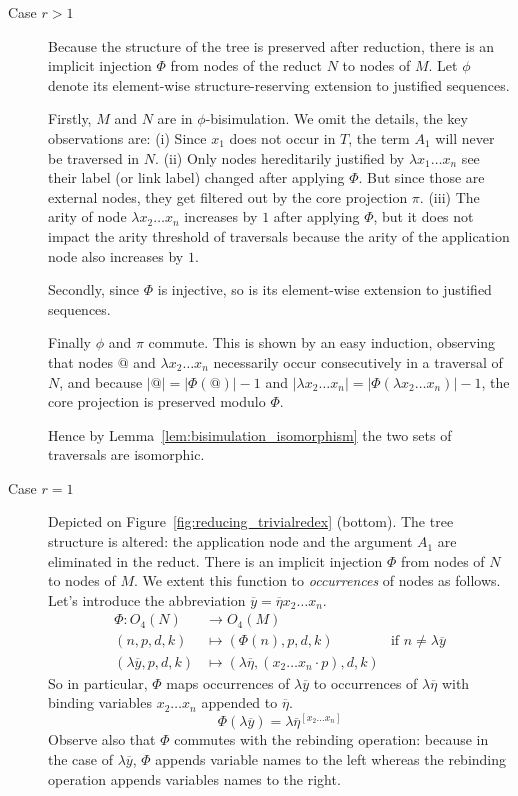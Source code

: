 \documentclass{article}
\theoremstyle{plain}
\theoremstyle{definition}
\theoremstyle{remark}
\def\coresymbol{\pi} %
\begin{document}
    \begin{description}
    \item[Case $r>1$] Because the structure of the tree is preserved after reduction, there is an implicit injection $\Phi$ from nodes of the reduct $N$ to nodes of $M$. Let $\phi$ denote its element-wise structure-reserving  extension to justified sequences.

    Firstly, $M$ and $N$ are in $\phi$-bisimulation. We omit the details, the key observations are:
    (i) Since $x_1$ does not occur in $T$, the term $A_1$ will never be traversed in $N$.
    (ii) Only nodes hereditarily justified by $\lambda x_1 \ldots x_n$ see their label (or link label) changed after applying $\Phi$. But since those are external nodes, they get filtered out by the core projection $\coresymbol$.
    (iii) The arity of node $\lambda x_2 \ldots x_n$ increases by $1$ after applying $\Phi$, but it does not impact the arity threshold of traversals because the arity of the application node also increases by $1$.

    Secondly, since $\Phi$ is injective, so is its element-wise extension to justified sequences.

    Finally $\phi$ and $\coresymbol$ commute. This is shown by an easy induction, observing that nodes $@$ and $\lambda x_2\ldots x_n$ necessarily occur consecutively in a traversal of $N$, and because $|@| = |\Phi(@)| -1$ and $|\lambda x_2\ldots x_n| = |\Phi(\lambda x_2\ldots x_n)| - 1$, the core projection is preserved modulo $\Phi$.

    Hence by Lemma~\ref{lem:bisimulation_isomorphism} the two sets of traversals are isomorphic.

    \item[Case $r=1$] Depicted on Figure~\ref{fig:reducing_trivialredex} (bottom). The tree structure is altered: the application node and the argument $A_1$ are eliminated in the reduct. There is an implicit injection $\Phi$ from nodes of $N$ to nodes of $M$. We extent this function to \emph{occurrences} of nodes as follows. Let's introduce the abbreviation $\overline{y} = \overline\eta x_2 \ldots x_n$.
    \begin{align*}
        \Phi\colon O_4(N) &\rightarrow O_4(M) \\
        (n,p,d,k) &\longmapsto (\Phi(n),p,d,k) & \mbox{if $n\neq\lambda\overline{y}$} \\
        (\lambda\overline{y},p,d,k) &\longmapsto (\lambda\overline\eta,(x_2 \ldots x_n \cdot p),d,k)
    \end{align*}
    So in particular, $\Phi$ maps occurrences of $\lambda\overline{y}$ to occurrences of $\lambda\overline\eta$ with binding variables $x_2 \ldots x_n$ appended to $\overline\eta$.
    \begin{equation}
        \Phi(\lambda\overline{y})
        =
        \lambda\overline\eta^{[x_2\ldots x_n]}
        \label{eqn:phi_maps_lambday_to_lambdaeta}
    \end{equation}
    Observe also that $\Phi$ commutes with the rebinding operation: because in the case of $\lambda\overline{y}$, $\Phi$ appends variable names to the left whereas the rebinding operation appends variables names to the right.


\end{description}
\end{document}
